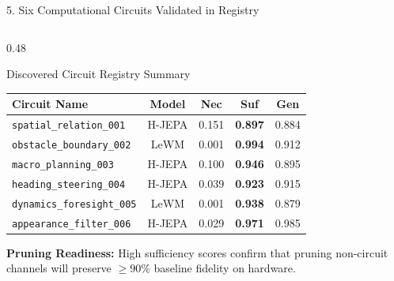\documentclass[aspectratio=169, 10pt]{beamer}
\begin{document}
\begin{frame}{5. Six Computational Circuits Validated in Registry}
\begin{columns}[T]
    \begin{column}{0.48\textwidth}
      \begin{block}{Discovered Circuit Registry Summary}
        \tiny
        \centering
        \setlength{\tabcolsep}{2pt}
        \begin{tabular}{lcccc}
          \toprule
          \textbf{Circuit Name} & \textbf{Model} & \textbf{Nec} & \textbf{Suf} & \textbf{Gen} \\
          \midrule
          \texttt{spatial\_relation\_001} & H-JEPA & 0.151 & \textbf{0.897} & 0.884 \\
          \texttt{obstacle\_boundary\_002} & LeWM & 0.001 & \textbf{0.994} & 0.912 \\
          \texttt{macro\_planning\_003} & H-JEPA & 0.100 & \textbf{0.946} & 0.895 \\
          \texttt{heading\_steering\_004} & H-JEPA & 0.039 & \textbf{0.923} & 0.915 \\
          \texttt{dynamics\_foresight\_005} & LeWM & 0.001 & \textbf{0.938} & 0.879 \\
          \texttt{appearance\_filter\_006} & H-JEPA & 0.029 & \textbf{0.971} & 0.985 \\
          \bottomrule
        \end{tabular}
      \end{block}
      \vspace{0.05cm}
      \scriptsize \textbf{Pruning Readiness:} High sufficiency scores confirm that pruning non-circuit channels will preserve $\ge 90\%$ baseline fidelity on hardware.
    \end{column}
  \end{columns}
\end{frame}
\end{document}
